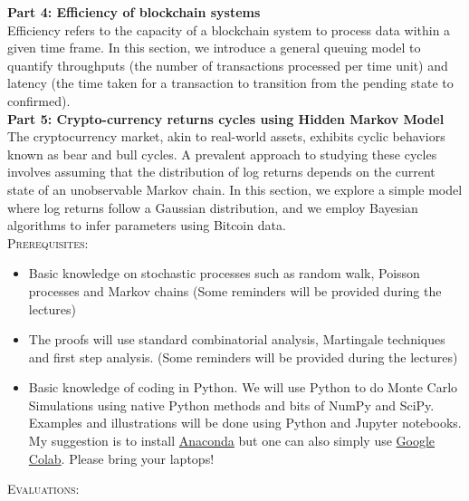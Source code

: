 \documentclass[11pt]{article}
\begin{document}
\noindent \textbf{Part 4: Efficiency of blockchain systems}\\
\noindent Efficiency refers to the capacity of a blockchain system to process data within a given time frame. In this section, we introduce a general queuing model to quantify throughputs (the number of transactions processed per time unit) and latency (the time taken for a transaction to transition from the pending state to confirmed).     
\\

\noindent \textbf{Part 5: Crypto-currency returns cycles using Hidden Markov Model}\\
\noindent The cryptocurrency market, akin to real-world assets, exhibits cyclic behaviors known as bear and bull cycles. A prevalent approach to studying these cycles involves assuming that the distribution of log returns depends on the current state of an unobservable Markov chain. In this section, we explore a simple model where log returns follow a Gaussian distribution, and we employ Bayesian algorithms to infer parameters using Bitcoin data.
\\

\textsc{Prerequisites:}
\begin{itemize}  
\item Basic knowledge on stochastic processes such as random walk, Poisson processes and Markov chains (Some reminders will be provided during the lectures)  
\item The proofs will use standard combinatorial analysis, Martingale techniques and first step analysis. (Some reminders will be provided during the lectures)  
\item Basic knowledge of coding in Python. We will use Python to do Monte Carlo Simulations using native Python methods and bits of NumPy and SciPy. Examples and illustrations will be done using Python and Jupyter notebooks. My suggestion is to install \href{https://www.anaconda.com/products/individual}{Anaconda} but one can also simply use \href{https://colab.research.google.com/}{Google Colab}. Please bring your laptops!
\end{itemize}


\textsc{Evaluations:}\\
\end{document}
